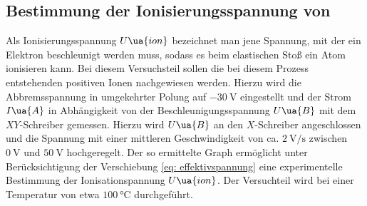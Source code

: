 \subsection{Bestimmung der Ionisierungsspannung von }
Als Ionisierungsspannung $U\ua{ion}$ bezeichnet man jene Spannung, mit der ein Elektron beschleunigt werden
muss, sodass es beim elastischen Stoß ein Atom ionisieren kann. Bei diesem Versuchsteil sollen die bei diesem
Prozess entstehenden positiven Ionen nachgewiesen werden. Hierzu wird die Abbremsspannung in umgekehrter Polung
auf $\SI{-30}{\volt}$ eingestellt und der Strom $I\ua{A}$ in Abhängigkeit von der Beschleunigungsspannung $U\ua{B}$
mit dem $XY$-Schreiber gemessen. Hierzu wird $U\ua{B}$ an den $X$-Schreiber angeschlossen und die Spannung mit einer %
mittleren Geschwindigkeit von ca. $\SI{2}{\volt \per\second}$ zwischen $\SI{0}{\volt}$ und $\SI{50}{\volt}$ hochgeregelt.
Der so ermittelte Graph ermöglicht unter Berücksichtigung der Verschiebung \ref{eq: effektivspannung} eine
experimentelle Bestimmung der Ionisationspannung $U\ua{ion}$. Der Versuchteil wird bei einer Temperatur von etwa $\SI{100}{\celsius}$
durchgeführt.
